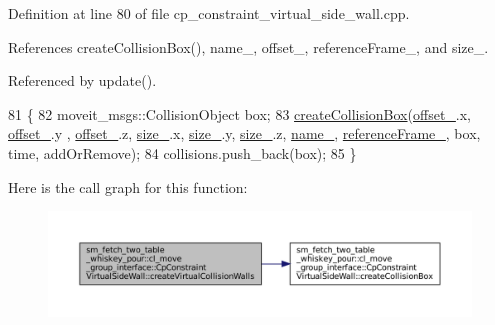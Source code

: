 Definition at line 80 of file cp\+\_\+constraint\+\_\+virtual\+\_\+side\+\_\+wall.\+cpp.



References create\+Collision\+Box(), name\+\_\+, offset\+\_\+, reference\+Frame\+\_\+, and size\+\_\+.



Referenced by update().


\begin{DoxyCode}
81         \{
82             moveit\_msgs::CollisionObject box;
83             \hyperlink{classsm__fetch__two__table__whiskey__pour_1_1cl__move__group__interface_1_1CpConstraintVirtualSideWall_ae495cc19dbaacf4cc7f4df803193ae92}{createCollisionBox}(\hyperlink{classsm__fetch__two__table__whiskey__pour_1_1cl__move__group__interface_1_1CpConstraintVirtualSideWall_a669238102dc5ac73255f10bc80c1ce69}{offset\_}.x, \hyperlink{classsm__fetch__two__table__whiskey__pour_1_1cl__move__group__interface_1_1CpConstraintVirtualSideWall_a669238102dc5ac73255f10bc80c1ce69}{offset\_}.y , 
      \hyperlink{classsm__fetch__two__table__whiskey__pour_1_1cl__move__group__interface_1_1CpConstraintVirtualSideWall_a669238102dc5ac73255f10bc80c1ce69}{offset\_}.z, \hyperlink{classsm__fetch__two__table__whiskey__pour_1_1cl__move__group__interface_1_1CpConstraintVirtualSideWall_a0e9605699e39ffcda32a22a07fffd544}{size\_}.x, \hyperlink{classsm__fetch__two__table__whiskey__pour_1_1cl__move__group__interface_1_1CpConstraintVirtualSideWall_a0e9605699e39ffcda32a22a07fffd544}{size\_}.y, \hyperlink{classsm__fetch__two__table__whiskey__pour_1_1cl__move__group__interface_1_1CpConstraintVirtualSideWall_a0e9605699e39ffcda32a22a07fffd544}{size\_}.z, \hyperlink{classsm__fetch__two__table__whiskey__pour_1_1cl__move__group__interface_1_1CpConstraintVirtualSideWall_ae90ce7726ac0391281f3f256f855be68}{name\_}, 
      \hyperlink{classsm__fetch__two__table__whiskey__pour_1_1cl__move__group__interface_1_1CpConstraintVirtualSideWall_a6585ab4c5d9c3dd91be0d2d8b87804bb}{referenceFrame\_}, box, time, addOrRemove);
84             collisions.push\_back(box);
85         \}
\end{DoxyCode}
Here is the call graph for this function\+:
\nopagebreak
\begin{figure}[H]
\begin{center}
\leavevmode
\includegraphics[width=350pt]{classsm__fetch__two__table__whiskey__pour_1_1cl__move__group__interface_1_1CpConstraintVirtualSideWall_ad4ecafb1a6c5cc8f72f04643047c0b03_cgraph}
\end{center}
\end{figure}
